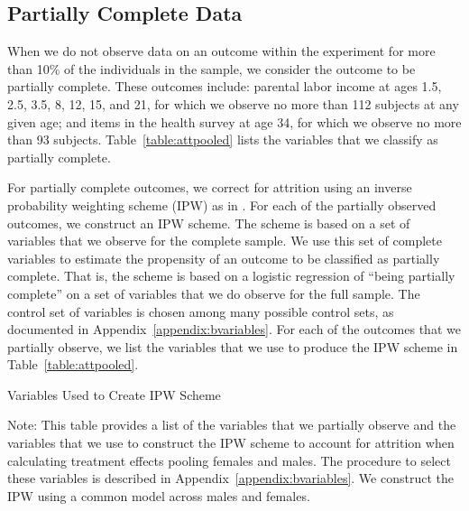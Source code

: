 \subsection{Partially Complete Data}
\label{app:method_partialobs}

When we do not observe data on an outcome within the experiment for more than 10\% of the individuals in the sample, we consider the outcome to be partially complete. These outcomes include: parental labor income at ages 1.5, 2.5, 3.5, 8, 12, 15, and 21, for which we observe no more than 112 subjects at any given age; and items in the health survey at age 34, for which we observe no more than 93 subjects. Table~\ref{table:attpooled} lists the variables that we classify as partially complete.

\noindent For partially complete outcomes, we correct for attrition using an inverse probability weighting scheme (IPW) as in  \citet{Horvitz_Thompson_1952_JASA}. For each of the partially observed outcomes, we construct an IPW scheme. The scheme is based on a set of variables that we observe for the complete sample. We use this set of complete variables to estimate the propensity of an outcome to be classified as partially complete. That is, the scheme is based on a logistic regression of ``being partially complete'' on a set of variables that we do observe for the full sample. The control set of variables is chosen among many possible control sets,  as documented in Appendix~\ref{appendix:bvariables}. For each of the outcomes that we partially observe, we list the variables that we use to produce the IPW scheme in Table~\ref{table:attpooled}.

\begin{table}
\begin{threeparttable}
\caption{Variables Used to Create IPW Scheme}
\label{table:attpooled}
\centering

\begin{tablenotes}
\footnotesize
\item Note: This table provides a list of the variables that we partially observe and the variables that we use to construct the IPW scheme to account for attrition when calculating treatment effects pooling females and males. The procedure to select these variables is described in Appendix~\ref{appendix:bvariables}. We construct the IPW using a common model across males and females.
\end{tablenotes}
\end{threeparttable}
\end{table}
\restoregeometry
\doublespacing

